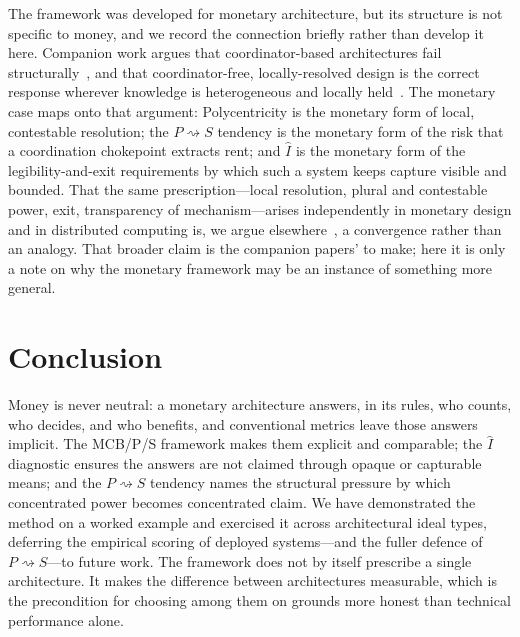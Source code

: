 \documentclass[11pt]{article}
\theoremstyle{definition}
\newcommand{\Iax}{\ensuremath{\hat{I}}}
\begin{document}
The framework was developed for monetary architecture, but its structure is not
specific to money, and we record the connection briefly rather than develop it here.
Companion work argues that coordinator-based architectures fail
structurally~\cite{nicholson2026}, and that coordinator-free, locally-resolved design
is the correct response wherever knowledge is heterogeneous and locally
held~\cite{nicholson2026hlks}. The monetary case maps onto that argument:
Polycentricity is the monetary form of local, contestable resolution; the $P
\rightsquigarrow S$ tendency is the monetary form of the risk that a coordination
chokepoint extracts rent; and $\Iax$ is the monetary form of the legibility-and-exit
requirements by which such a system keeps capture visible and bounded. That the same
prescription---local resolution, plural and contestable power, exit, transparency of
mechanism---arises independently in monetary design and in distributed computing is,
we argue elsewhere~\cite{nicholson2026hlks}, a convergence rather than an analogy.
That broader claim is the companion papers' to make; here it is only a note on why the
monetary framework may be an instance of something more general.

\section{Conclusion}

Money is never neutral: a monetary architecture answers, in its rules, who counts,
who decides, and who benefits, and conventional metrics leave those answers implicit.
The MCB/P/S framework makes them explicit and comparable; the $\Iax$ diagnostic
ensures the answers are not claimed through opaque or capturable means; and the $P
\rightsquigarrow S$ tendency names the structural pressure by which concentrated power
becomes concentrated claim. We have demonstrated the method on a worked example and
exercised it across architectural ideal types, deferring the empirical scoring of
deployed systems---and the fuller defence of $P \rightsquigarrow S$---to future work.
The framework does not by itself prescribe a single architecture. It makes the difference
between architectures measurable, which is the precondition for choosing among them on
grounds more honest than technical performance alone.


\end{document}
